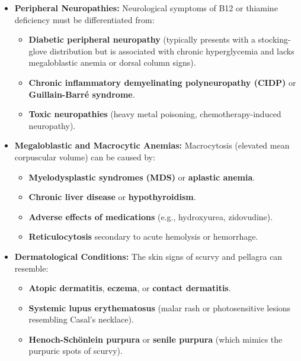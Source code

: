 \begin{itemize}
    \item \textbf{Peripheral Neuropathies:} Neurological symptoms of B12 or thiamine deficiency must be differentiated from:
    \begin{itemize}
        \item \textbf{Diabetic peripheral neuropathy} (typically presents with a stocking-glove distribution but is associated with chronic hyperglycemia and lacks megaloblastic anemia or dorsal column signs).
        \item \textbf{Chronic inflammatory demyelinating polyneuropathy (CIDP)} or \textbf{Guillain-Barr\'e syndrome}.
        \item \textbf{Toxic neuropathies} (heavy metal poisoning, chemotherapy-induced neuropathy).
    \end{itemize}

    \item \textbf{Megaloblastic and Macrocytic Anemias:} Macrocytosis (elevated mean corpuscular volume) can be caused by:
    \begin{itemize}
        \item \textbf{Myelodysplastic syndromes (MDS)} or \textbf{aplastic anemia}.
        \item \textbf{Chronic liver disease} or \textbf{hypothyroidism}.
        \item \textbf{Adverse effects of medications} (e.g., hydroxyurea, zidovudine).
        \item \textbf{Reticulocytosis} secondary to acute hemolysis or hemorrhage.
    \end{itemize}

    \item \textbf{Dermatological Conditions:} The skin signs of scurvy and pellagra can resemble:
    \begin{itemize}
        \item \textbf{Atopic dermatitis}, \textbf{eczema}, or \textbf{contact dermatitis}.
        \item \textbf{Systemic lupus erythematosus} (malar rash or photosensitive lesions resembling Casal's necklace).
        \item \textbf{Henoch-Sch\"onlein purpura} or \textbf{senile purpura} (which mimics the purpuric spots of scurvy).
    \end{itemize}


\end{itemize}
